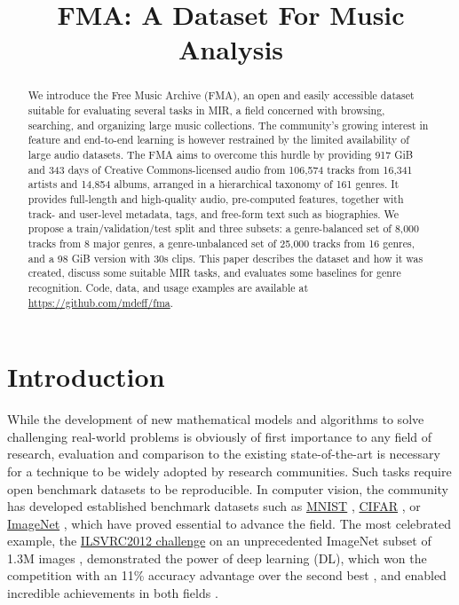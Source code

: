 \documentclass{article}
\title{FMA: A Dataset For Music Analysis}
\newcommand{\ntracks}{106,574 }
\newcommand{\nartists}{16,341 }
\newcommand{\nalbums}{14,854 }
\newcommand{\ngenres}{161 }
\newcommand{\tduration}{343 }
\newcommand{\size}{917 }
\newcommand{\weblink}{https://github.com/mdeff/fma}
\begin{document}
\maketitle

\begin{abstract}
We introduce the Free Music Archive (FMA), an open and easily accessible dataset suitable for evaluating several tasks in MIR, a field concerned with browsing, searching, and organizing large music collections.
The community's growing interest in feature and end-to-end learning is however restrained by the limited availability of large audio datasets.
The FMA aims to overcome this hurdle by providing \size GiB and \tduration days of Creative Commons-licensed audio from \ntracks tracks from \nartists artists and \nalbums albums, arranged in a hierarchical taxonomy of \ngenres genres.
It provides full-length and high-quality audio, pre-computed features, together with track- and user-level metadata, tags, and free-form text such as biographies.
We propose a train/validation/test split and three subsets: a genre-balanced set of 8,000 tracks from 8 major genres, a genre-unbalanced set of 25,000 tracks from 16 genres, and a 98 GiB version with 30s clips.
This paper describes the dataset and how it was created, discuss some suitable MIR tasks, and evaluates some baselines for genre recognition.
Code, data, and usage examples are available at \url{\weblink}.
\end{abstract}

\section{Introduction} %


While the development of new mathematical models and algorithms to solve challenging real-world problems is obviously of first importance to any field of research, evaluation and comparison to the existing state-of-the-art is necessary for a technique to be widely adopted by research communities. Such tasks require open benchmark datasets to be reproducible. %
In computer vision, the community has developed established benchmark datasets such as \href{http://yann.lecun.com/exdb/mnist/}{MNIST} \cite{mnist}, \href{https://www.cs.toronto.edu/~kriz/cifar.html}{CIFAR} \cite{cifar}, or \href{http://www.image-net.org}{ImageNet} \cite{imagenet}, which have proved essential to advance the field. The most celebrated example, the \href{http://www.image-net.org/challenges/LSVRC/2012/}{ILSVRC2012 challenge} on an unprecedented ImageNet subset of 1.3M images \cite{imagenet_challenge}, demonstrated the power of deep learning (DL), which won the competition with an 11\% accuracy advantage over the second best \cite{convnet_imagenet}, and enabled incredible achievements in both fields \cite{dl}.
\end{document}
